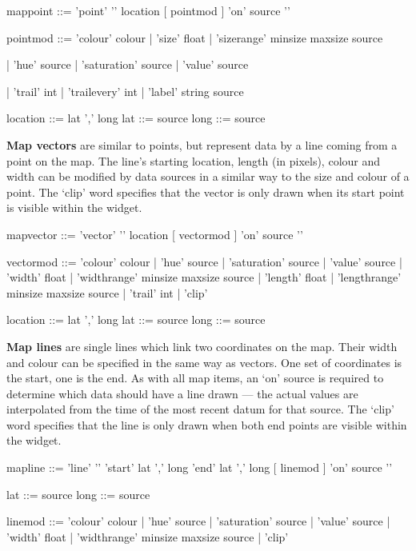 \begin{v}
mappoint    ::= 'point' '{' location [{ pointmod }] 'on' source '}'

pointmod    ::= 'colour' colour
            |   'size' float
            |   'sizerange' minsize maxsize source

            |   'hue' source
            |   'saturation' source
            |   'value' source

            |   'trail' int
            |   'trailevery' int
            |   'label' string source

location    ::= lat ',' long
lat         ::= source
long        ::= source
\end{v}

\textbf{Map vectors} are similar to points, but represent data
by a line coming from a point on the map. The line's starting location,
length (in pixels), colour and width can be modified by data sources
in a similar way to the size and colour of a point. The `clip' word specifies
that the vector is only drawn when its start point is visible within the widget.

\begin{v}
mapvector    ::= 'vector' '{' location [{ vectormod }] 'on' source '}'

vectormod    ::= 'colour' colour
            |   'hue' source
            |   'saturation' source
            |   'value' source
            |   'width' float
            |   'widthrange' minsize maxsize source
            |   'length' float
            |   'lengthrange' minsize maxsize source
            |   'trail' int
            |   'clip'

location    ::= lat ',' long
lat         ::= source
long        ::= source
\end{v}

\textbf{Map lines} are single lines which link two coordinates on the map.
Their width and colour can be specified in the same way as vectors.
One set of coordinates is the start, one is the end. As with all map items, an `on'
source is required to determine which data should have a line drawn --- the actual values
are interpolated from the time of the most recent datum for that source. The `clip' word specifies
that the line is only drawn when both end points are visible within the widget.

\begin{v}
mapline ::=     'line' '{' 
                'start' lat ',' long
                'end' lat ',' long
                [{ linemod }]
                'on' source 
                '}'

lat         ::= source
long        ::= source

linemod     ::= 'colour' colour
            |   'hue' source
            |   'saturation' source
            |   'value' source
            |   'width' float
            |   'widthrange' minsize maxsize source
            |   'clip'
\end{v}


